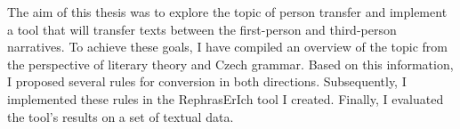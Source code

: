 The aim of this thesis was to explore the topic of person transfer and implement a tool that will transfer texts between the first-person and third-person narratives.
To achieve these goals, I have compiled an overview of the topic from the perspective of literary theory and Czech grammar. Based on this information, I proposed several rules for conversion in both directions. Subsequently, I implemented these rules in the RephrasErIch tool I created. Finally, I evaluated the tool's results on a set of textual data.


